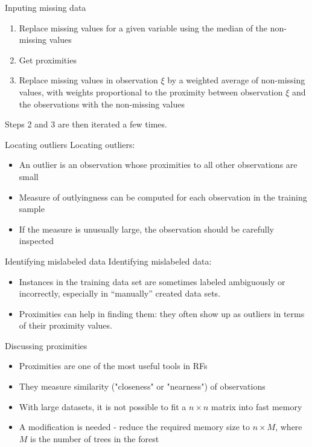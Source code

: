 \documentclass[11pt,compress,t,notes=noshow, xcolor=table]{beamer}
\begin{document}
\begin{vbframe}{Inputing missing data}
\begin{enumerate}
\item Replace missing values for a given variable using the median of the non-missing values
\item Get proximities
\item Replace missing values in observation $\xi$ by a weighted average of non-missing values, with weights proportional to the proximity between observation $\xi$ and the observations with the non-missing values
\end{enumerate}
Steps 2 and 3 are then iterated a few times. %
\end{vbframe}

\begin{vbframe}{Locating outliers}
Locating outliers: 
\begin{itemize}
\item An outlier is an observation whose proximities to all other observations are small
\item Measure of outlyingness can be computed for each observation in the training sample
\item If the measure is unusually large, the observation should be carefully inspected
\end{itemize}
\end{vbframe}

\begin{vbframe}{Identifying mislabeled data}
Identifying mislabeled data:
\begin{itemize}
\item Instances in the training data set are sometimes labeled ambiguously or incorrectly, especially in \enquote{manually} created data sets.
\item Proximities can help in finding them: they often show up as outliers in terms of their proximity values. 
\end{itemize}
\end{vbframe}

\begin{vbframe}{Discussing proximities}
\begin{itemize}
  \item Proximities are one of the most useful tools in RFs
  \item They measure similarity ("closeness" or "nearness") of observations
  \item With large datasets, it is not possible to fit a $n \times n$ matrix into fast memory
  \item A modification is needed - reduce the required memory size to $n \times M$, where $M$ is the number of trees in the forest
\end{itemize}
\end{vbframe}

\endlecture
\end{document}
